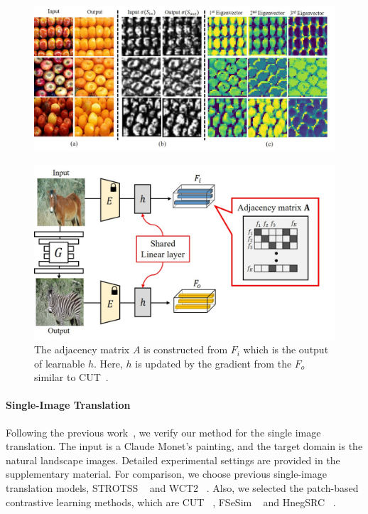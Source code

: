 \documentclass[letterpaper]{article} %
\begin{document}
\begin{figure}[t]
	\centering
	\includegraphics[width=0.85\linewidth]{figs/analy_21.jpg}
	\label{fig:analy}
\end{figure}

\begin{figure}[!t]
	\centering
	\includegraphics[width=0.85\linewidth]{figs/adj_FC_h.jpg}
	\caption{The adjacency matrix $A$ is constructed from $F_i$ which is the output of learnable $h$. Here, $h$ is updated by the gradient from the $F_o$ similar to CUT~\cite{cut}. }
	\label{fig:adj_FC}
\end{figure}


\paragraph{Single-Image Translation}
Following the previous work~\cite{cut}, we verify our method for the single image translation. The input is a Claude Monet's painting, and the target domain is the natural landscape images.
Detailed experimental settings are provided in the supplementary material.
For comparison, we choose previous single-image translation models, STROTSS ~\cite{strotss} and WCT2 ~\cite{wct2}. Also, we selected the patch-based contrastive learning methods, which are CUT ~\cite{cut}, FSeSim ~\cite{sesim} and HnegSRC ~\cite{HnegSRC}.
\end{document}
